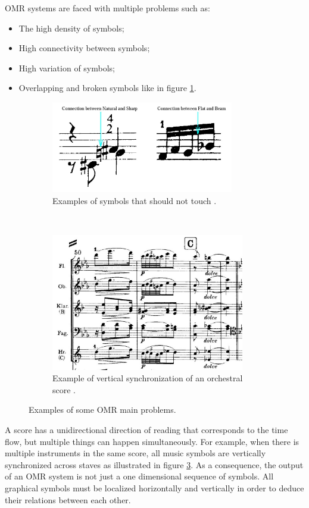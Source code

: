 \documentclass[11pt]{sdm}
\begin{document}
OMR systems are faced with multiple problems such as:
\begin{itemize}
  \item The high density of symbols;
  \item High connectivity between symbols;
  \item High variation of symbols;
  \item Overlapping and broken symbols like in figure \ref{connected_symbol}.
\end{itemize}
\begin{figure}[t!]
  \centering
  \begin{subfigure}[t]{0.5\textwidth}
    \centering
    \includegraphics[height=4cm]{img/connected_symbol}
    \caption{\label{connected_symbol} Examples of symbols that should not touch \cite{couasnon_using_1995}. }
  \end{subfigure}%
  ~
  \begin{subfigure}[t]{0.5\linewidth}
    \centering
    \includegraphics[height=6cm]{img/orchestral}
    \caption{\label{vertical_synchro} Example of vertical synchronization of an orchestral score \cite{_brahms_????}. }
  \end{subfigure}
  \caption{Examples of some OMR main problems.}
\end{figure}
A score has a unidirectional direction of reading that corresponds to the time flow, but multiple things can happen simultaneously.
For example, when there is multiple instruments in the same score, all music symbols are vertically synchronized across staves as illustrated in figure \ref{vertical_synchro}.
As a consequence, the output of an OMR system is not just a one dimensional sequence of symbols.
All graphical symbols must be localized horizontally and vertically in order to deduce their relations between each other.
\end{document}
